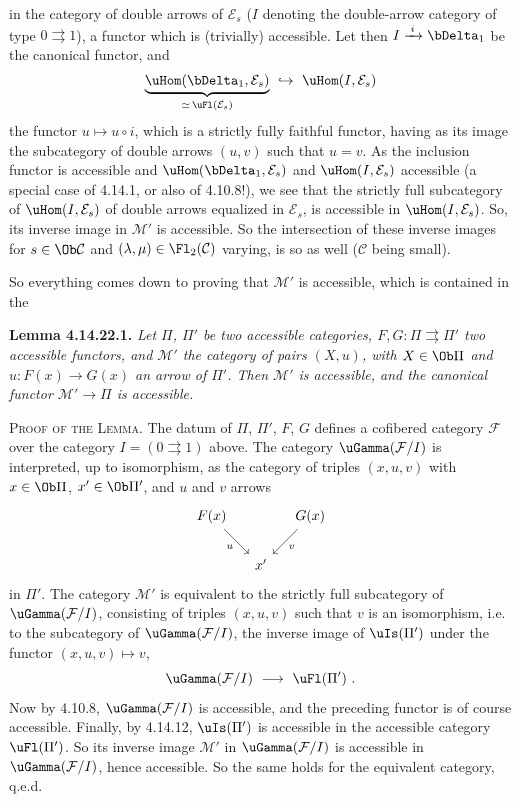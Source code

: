 in the category of double arrows of $\mathcal{E}_s$ ($I$ denoting the double-arrow category of type $0\rightrightarrows 1$), a functor which is (trivially) accessible. Let then $I\xrightarrow{\;i\;}\bDelta_1$ be the canonical functor, and
\[
\underbrace{\uHom(\bDelta_1,\mathcal{E}_s)}_{\simeq\,\uFl(\mathcal{E}_s)}\ \hookrightarrow\ \uHom(I,\mathcal{E}_s)
\]
the functor $u\longmapsto u\circ i$, which is a strictly fully faithful functor, having as its image the subcategory of double arrows $(u,v)$ such that $u=v$. As the inclusion functor is accessible and $\uHom(\bDelta_1,\mathcal{E}_s)$ and $\uHom(I,\mathcal{E}_s)$ accessible
(a special case of 4.14.1, or also of 4.10.8!), we see that the strictly full subcategory of $\uHom(I,\mathcal{E}_s)$ of double arrows equalized in $\mathcal{E}_s$, is accessible in $\uHom(I,\mathcal{E}_s)$. So, its inverse image in $\mathcal{M}'$ is accessible. So the intersection of these inverse images for $s\in\Ob\mathcal{C}$ and $(\lambda,\mu)\in\Fl_2(\mathcal{C})$ varying, is so as well ($\mathcal{C}$ being small).

So everything comes down to proving that $\mathcal{M}'$ is accessible, which is contained in the

\textbf{Lemma 4.14.22.1.} \textit{Let $\Pi$, $\Pi'$ be two accessible categories, $F,G:\Pi\rightrightarrows\Pi'$ two accessible functors, and $\mathcal{M}'$ the category of pairs $(X,u)$, with $X\in\Ob\Pi$ and $u:F(x)\longrightarrow G(x)$ an arrow of $\Pi'$. Then $\mathcal{M}'$ is accessible, and the canonical functor $\mathcal{M}'\longrightarrow\Pi$ is accessible.} %

\textsc{Proof of the Lemma.} The datum of $\Pi$, $\Pi'$, $F$, $G$ defines a cofibered category $\mathcal{F}$ over the category $I=(0\rightrightarrows 1)$
above. The category $\uGamma(\mathcal{F}/I)$ is interpreted, up to isomorphism, as the category of triples $(x,u,v)$ with $x\in\Ob\Pi$, $x'\in\Ob\Pi'$, and $u$ and $v$ arrows
\[
\begin{tikzcd}[column sep=small]
F(x) \arrow[dr, "u"'] & & G(x) \arrow[dl, "v"] \\
& x' &
\end{tikzcd}
\]
in $\Pi'$. The category $\mathcal{M}'$ is equivalent to the strictly full subcategory of $\uGamma(\mathcal{F}/I)$, consisting of triples $(x,u,v)$ such that $v$ is an isomorphism, i.e. to the subcategory of $\uGamma(\mathcal{F}/I)$, the inverse image of $\uIs(\Pi')$ under the functor $(x,u,v)\longmapsto v$,
\[
\uGamma(\mathcal{F}/I)\ \longrightarrow\ \uFl(\Pi')\ .
\]
Now by 4.10.8, $\uGamma(\mathcal{F}/I)$ is accessible, and the preceding functor is of course accessible. Finally, by 4.14.12,
$\uIs(\Pi')$ is accessible in the accessible category $\uFl(\Pi')$. So its inverse image $\mathcal{M}'$ in $\uGamma(\mathcal{F}/I)$ is accessible in $\uGamma(\mathcal{F}/I)$, hence accessible. So the same holds for the equivalent category, q.e.d.


